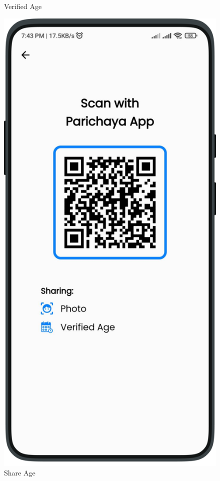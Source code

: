 \begin{multicols}{3}
\begin{figure}[H]
            \caption[Verified Age]{Verified Age}
            \label{fig:VerifyAge.png}
            \end{figure}
              \begin{figure}[H]
            \centering
            \includegraphics[width=0.8\linewidth]{images/results/mobile/VerifyAgeQR.png}
            \caption[Share Age]{Share Age}
            \label{fig:VerifyAgeQR.png}
            \end{figure}
              \begin{figure}[H]
            \centering

\end{figure}
\end{multicols}
